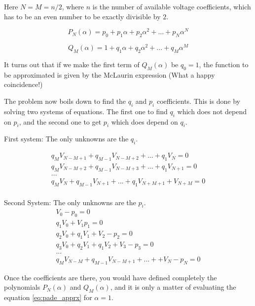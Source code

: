 \documentclass[11pt,fleqn]{book} %
\begin{document}
Here $N=M=n/2$, where $n$ is the number of available voltage coefficients, which has to be an even number to be exactly divisible by $2$.

\begin{equation}
P_N(\alpha) = p_0 + p_1\alpha + p_2\alpha^2 + ... + p_N\alpha^N
\end{equation}

\begin{equation}
Q_M(\alpha) = 1 + q_1\alpha + q_2\alpha^2 + ... + q_M\alpha^M
\end{equation}

It turns out that if we make the first term of $Q_M(\alpha)$ be $q_0=1$, the function to be approximated is given by the McLaurin expression (What a happy coincidence!)

The problem now boils down to find the $q_i$ and $p_i$ coefficients. This is done by solving two systems of equations. The first one to find $q_i$ which does not depend on $p_i$, and the second one to get $p_i$ which does depend on $q_i$.

First system: The only unknowns are the $q_i$.

\begin{equation}
\begin{matrix}
q_M V_{N-M+1} + q_{M-1}V_{N-M+2}+...+q_1V_N = 0\\
q_M V_{N-M+2} + q_{M-1}V_{N-M+3}+...+q_1V_{N+1} = 0\\
...\\
q_M V_{N} + q_{M-1}V_{N+1}+...+q_1V_{N+M+1} + V_{N+M} = 0\\
\end{matrix}
\end{equation}

Second System: The only unknowns are the $p_i$.
\begin{equation}
\begin{matrix}
V_0 - p_0=0\\
q_1V_0 + V_1  p_1=0\\
q_2V_0 + q_1V_1+V_2-p_2=0\\
q_3V_0 + q_2V_1 + q_1V_2 + V_3 - p_3 = 0\\
...\\
q_MV_{N-M} + q_{M-1}V_{N-M+1} + ... + +V_N - p_N=0
\end{matrix}
\end{equation}

Once the coefficients are there, you would have defined completely the polynomials $P_N(\alpha)$ and $Q_M(\alpha)$, and it is only a matter of evaluating the equation \ref{eq:pade_apprx} for $\alpha=1$.\newline
\end{document}
